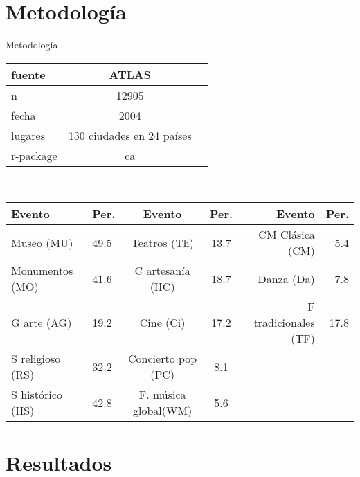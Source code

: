 \documentclass[12pt]{beamer}
\begin{document}
\section{Metodología}
Metodología \\
\begin{center}
\begin{tabular*}{0.4875\textwidth}{|l | c | r |}
	\hline
	{\scriptsize fuente} & {\scriptsize ATLAS} \\ \hline {\scriptsize n} & {\scriptsize 12905} \\ \hline {\scriptsize fecha} & {\scriptsize 2004} \\ \hline {\scriptsize lugares} & {\scriptsize 130 ciudades en 24 países} \\ \hline {\scriptsize r-package} & {\scriptsize ca}\\
	\hline 
\end{tabular*}\\
\end{center}
\begin{flushleft}
	\begin{tabular*}{0.923\textwidth}{ |l  l  c  c  r  r |}
	\hline
	{\scriptsize  Evento} & {\scriptsize  Per.} & {\scriptsize  Evento} & {\scriptsize  Per.} & {\scriptsize  Evento} & {\scriptsize  Per.} \\ \hline
	{\tiny Museo (MU)} & {\scriptsize 49.5} & {\tiny Teatros (Th)} & {\scriptsize 13.7} & {\tiny CM Clásica (CM)} & {\scriptsize 5.4} \\ {\tiny Monumentos (MO)} & {\scriptsize 41.6} & {\tiny C artesanía (HC)} & {\scriptsize 18.7} & {\tiny Danza (Da)} & {\scriptsize 7.8} \\
	{\tiny G arte (AG)} & {\scriptsize 19.2} & {\tiny Cine (Ci)} & {\scriptsize 17.2} & {\tiny F tradicionales (TF)} & {\scriptsize 17.8}	\\ {\tiny S religioso (RS)} & {\scriptsize 32.2} & {\tiny Concierto pop (PC)} & {\scriptsize 8.1} & & \\ {\tiny S histórico (HS)} & {\scriptsize 42.8} & {\tiny F. música global(WM)} & {\scriptsize 5.6} & &  \\ 
	\hline 
\end{tabular*}
\end{flushleft}

\clearpage
\section{Resultados}
\end{document}
